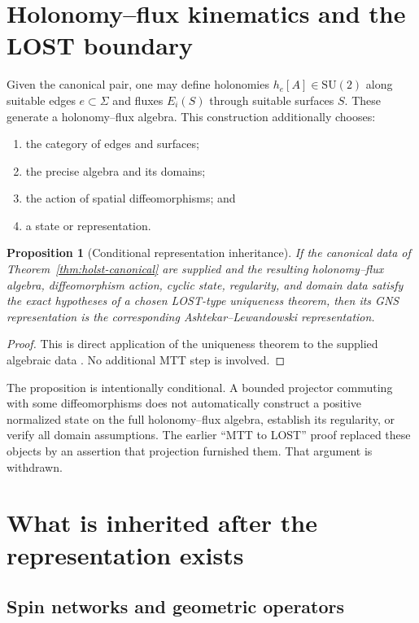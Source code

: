 \documentclass[11pt]{article}
\theoremstyle{plain}
\newtheorem{proposition}[theorem]{Proposition}
\newcommand{\SU}{\mathrm{SU}(2)}
\begin{document}
\section{Holonomy--flux kinematics and the LOST boundary}

Given the canonical pair, one may define holonomies
\(h_e[A]\in\SU\) along suitable edges \(e\subset\Sigma\) and fluxes
\(E_i(S)\) through suitable surfaces \(S\). These generate a
holonomy--flux algebra. This construction additionally chooses:
\begin{enumerate}
\item the category of edges and surfaces;
\item the precise algebra and its domains;
\item the action of spatial diffeomorphisms; and
\item a state or representation.
\end{enumerate}

\begin{proposition}[Conditional representation inheritance]
\label{prop:lost}
If the canonical data of Theorem~\ref{thm:holst-canonical} are supplied and
the resulting holonomy--flux algebra, diffeomorphism action, cyclic state,
regularity, and domain data satisfy the exact hypotheses of a chosen
LOST-type uniqueness theorem, then its GNS representation is the
corresponding Ashtekar--Lewandowski representation.
\end{proposition}

\begin{proof}
This is direct application of the uniqueness theorem to the supplied
algebraic data \cite{LOST2006,AL1995}. No additional MTT step is involved.
\end{proof}

The proposition is intentionally conditional. A bounded projector commuting
with some diffeomorphisms does not automatically construct a positive
normalized state on the full holonomy--flux algebra, establish its
regularity, or verify all domain assumptions. The earlier ``MTT to LOST''
proof replaced these objects by an assertion that projection furnished them.
That argument is withdrawn.

\section{What is inherited after the representation exists}

\subsection{Spin networks and geometric operators}
\end{document}
